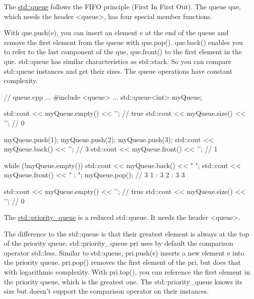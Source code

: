 

The \href{http://en.cppreference.com/w/cpp/container/queue}{std::queue} follows the FIFO principle (First In First Out). The queue que, which needs the header <queue>, has four special member functions.

With que.push(e), you can insert an element e at the end of the queue and remove the first element from the queue with que.pop(). que.back() enables you to refer to the last component of the que, que.front() to the first element in the que. std::queue has similar characteristics as std::stack. So you can compare std::queue instances and get their sizes. The queue operations have constant complexity.


\begin{cpp}
// queue.cpp
...
#include <queue>
...
std::queue<int> myQueue;

std::cout << myQueue.empty() << '\n'; // true
std::cout << myQueue.size() << '\n'; // 0

myQueue.push(1);
myQueue.push(2);
myQueue.push(3);
std::cout << myQueue.back() << '\n'; // 3
std::cout << myQueue.front() << '\n'; // 1

while (!myQueue.empty()){
	std::cout << myQueue.back() << " ";
	std::cout << myQueue.front() << " : ";
	myQueue.pop();
} // 3 1 : 3 2 : 3 3
	
std::cout << myQueue.empty() << '\n'; // true
std::cout << myQueue.size() << '\n'; // 0
\end{cpp}




The \href{http://en.cppreference.com/w/cpp/container/priority_queue}{std::priority\_queue} is a reduced std::queue. It needs the header <queue>.

The difference to the std::queue is that their greatest element is always at the top of the priority queue. std::priority\_queue pri uses by default the comparison operator std::less. Similar to std::queue, pri.push(e) inserts a new element e into the priority queue. pri.pop() removes the first element of the pri, but does that with logarithmic complexity. With pri.top(), you can reference the first element in the priority queue, which is the greatest one. The std::priority\_queue knows its size but doesn’t support the comparison operator on their instances.

